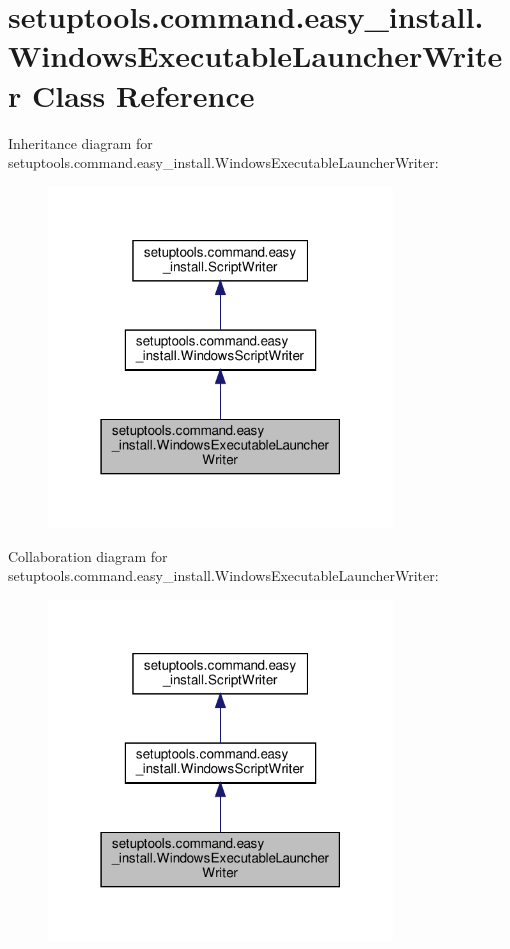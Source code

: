 \hypertarget{classsetuptools_1_1command_1_1easy__install_1_1WindowsExecutableLauncherWriter}{}\section{setuptools.\+command.\+easy\+\_\+install.\+Windows\+Executable\+Launcher\+Writer Class Reference}
\label{classsetuptools_1_1command_1_1easy__install_1_1WindowsExecutableLauncherWriter}


Inheritance diagram for setuptools.\+command.\+easy\+\_\+install.\+Windows\+Executable\+Launcher\+Writer\+:
\nopagebreak
\begin{figure}[H]
\begin{center}
\leavevmode
\includegraphics[width=259pt]{classsetuptools_1_1command_1_1easy__install_1_1WindowsExecutableLauncherWriter__inherit__graph}
\end{center}
\end{figure}


Collaboration diagram for setuptools.\+command.\+easy\+\_\+install.\+Windows\+Executable\+Launcher\+Writer\+:
\nopagebreak
\begin{figure}[H]
\begin{center}
\leavevmode
\includegraphics[width=259pt]{classsetuptools_1_1command_1_1easy__install_1_1WindowsExecutableLauncherWriter__coll__graph}
\end{center}
\end{figure}
